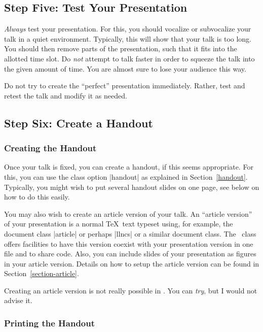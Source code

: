 \subsection{Step Five: Test Your Presentation}

\emph{Always} test your presentation. For this, you should
vocalize or subvocalize your talk in a quiet environment. Typically,
this will show that your talk is too long. You should then remove
parts of the presentation, such that it fits into the allotted time
slot. Do \emph{not} attempt to talk faster in order to squeeze the
talk into the given amount of time. You are almost sure to lose your
audience this way.

Do not try to create the ``perfect'' presentation immediately. Rather,
test and retest the talk and modify it as needed.




\subsection{Step Six: Create a Handout}

\subsubsection{Creating the Handout}

Once your talk is fixed, you can create a handout, if this seems
appropriate. For this, you can use the class option |handout| as
explained in Section~\ref{handout}. Typically, you might wish
to put several handout slides on one page, see below on how to do
this easily.

You may also wish to create an article version of your talk. An
``article version'' of your presentation is a normal \TeX\ text
typeset using, for example, the document class |article| or perhaps
|llncs| or a similar document class. The \beamer\ class offers
facilities to have this version coexist with your presentation version
in one file and to share code. Also, you can include slides of your
presentation as figures in your article version. Details on how to
setup the article version can be found in
Section~\ref{section-article}.

\lyxnote
Creating an article version is not really possible in \LyX. You
can \emph{try}, but I would not advise it.


\subsubsection{Printing the Handout}
\label{section-printing-version}

